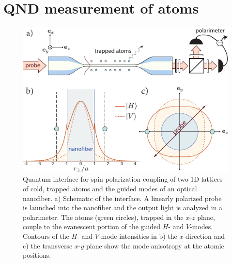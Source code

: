 \documentclass[preprint, aps,pra,onecolumn]{revtex4-1} %
\begin{document}
\section{QND measurement of atoms} \label{Sec::QNDMeasurement}

\begin{figure}[t]
\includegraphics[scale=1]{./Fig2}
\caption{Quantum interface for spin-polarization coupling of two 1D lattices of cold, trapped atoms and the guided modes of an optical nanofiber. a) Schematic of the interface.  A linearly polarized probe is launched into the nanofiber and the output light is analyzed in a polarimeter.  The atoms (green circles), trapped in the $x$-$z$ plane, couple to the evanescent portion of the guided $H$- and $V$-modes.  Contours of the $H$- and $V$-mode intensities in b) the $x$-direction and c) the transverse $x$-$y$ plane show the mode anisotropy at the atomic positions. }\label{Fig::Schematic}
\end{figure}
\end{document}
